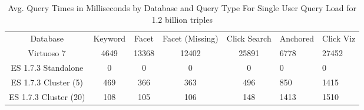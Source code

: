 \begin{table} 
    \begin{tabular}{ c c c c c }
        Database & Keyword & Facet & Facet (Missing) & Click Search & Anchored & Click Viz \\ 
        Virtuoso 7 & 4649 & 13368 & 12402 & 25891 & 6778 &  27452 \\ 
        ES 1.7.3 Standalone & 0 & 0 & 0 & 0 & 0 & 0 \\ 
        ES 1.7.3 Cluster (5) & 469 & 366 & 363 & 496 & 850 & 1415 \\ 
        ES 1.7.3 Cluster (20) & 108 & 105 & 106 & 148 & 1413 & 1510 \\ 
    \end{tabular} 
    \caption{Avg. Query Times in Milliseconds by Database and Query Type For Single User Query Load for 1.2 billion triples}
    \label{table:qt_single_user_1b}
\end{table}
